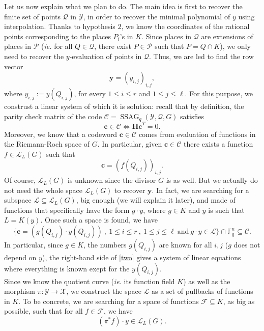 \documentclass[10pt]{article}
\theoremstyle{definition}
\theoremstyle{definition}
\theoremstyle{definition}
\newcommand{\cd}{\cdot}
\newcommand{\C}{\mathcal{C}}
\newcommand{\fq}{\mathbb{F}_q}
\newcommand{\su}{\subseteq}
\newcommand{\X}{\mathcal{X}}
\newcommand{\Y}{\mathcal{Y}}
\newcommand{\PR}{\mathcal{P}}
\newcommand{\QR}{\mathcal{Q}}
\newcommand{\ssag}{\operatorname{SSAG}}
\newcommand{\calL}{\mathcal{L}}
\begin{document}
Let us now explain what we plan to do. The main idea is first to recover the finite set of points $\QR$ in $\Y$, in order to recover the minimal polynomial of $y$ using interpolation. Thanks to hypothesis $2$, we know the coordinates of the rational points corresponding to the places $P_i$'s in $K$. Since places in $\QR$ are extensions of places in $\PR$ (\textit{ie.} for all $Q \in \mathcal{Q}$, there exist $P \in \PR$ such that $P=Q\cap K$), we only need to recover the $y$-evaluation of points in $\QR$. Thus, we are led to find the row vector
\begin{equation}
\textbf{y} = (y_{i,j})_{i,j},
\end{equation}
where $y_{i,j} := y(Q_{i,j})$, for every $1 \leq i \leq r$ and $1 \leq j \leq \ell$.
For this purpose, we construst a linear system of which it is solution: recall that by definition, the parity check matrix of the code $\mathcal{C}=\ssag_q(\Y,\QR,G)$ satisfies
\begin{equation} \label{two}
\mathbf{c} \in \mathcal{C} \iff \mathbf{Hc}^T = 0.
\end{equation}
Moreover, we know that a codeword $\mathbf{c} \in \mathcal{C}$ comes from evaluation of functions in the Riemann-Roch space of $G$. In particular, given $\mathbf{c} \in \C$ there exists a function $f \in \calL_L(G)$ such that  
\[\mathbf{c} = (f(Q_{i,j}))_{i,j}.\]
Of course, $\calL_L(G)$ is unknown since the divisor $G$ is as well. But we actually do not need the whole space $\calL_L(G)$ to recover $\mathbf{y}$. In fact, we are searching for a subspace $\mathcal{L} \su \calL_L(G)$, big enough (we will explain it later), and made of functions that specifically have the form $g \cd y$, where $g \in K$ and $y$ is such that $L=K(y)$. Once such a space is found, we have 
\[\{\mathbf{c}= (g(Q_{i,j}) \cd y(Q_{i,j})) \ , \ 1 \leq i \leq r \ , \ 1 \leq j \leq \ell \ \textrm{and} \ g\cd y \in \mathcal{L}\} \cap \fq^n \su \mathcal{C}.\] 
In particular, since $g \in K$, the numbers $g(Q_{i,j})$ are known for all $i,j$ ($g$ does not depend on $y$), the right-hand side of \eqref{two} gives a system of linear equations where everything is known exept for the $y(Q_{i,j})$. \\
Since we know the quotient curve (\textit{ie.} its function field $K$) as well as the morphism $\pi : \Y \rightarrow \X$, we construct the space $\mathcal{L}$ as a set of pullbacks of functions in $K$. To be concrete, we are searching for a space of functions $\mathcal{F} \su K$, as big as possible, such that for all $f \in \mathcal{F}$, we have
\begin{equation} \label{three}
(\pi^*f) \cd y \in \calL_L(G). 
\end{equation}
\end{document}

